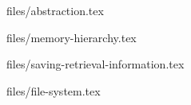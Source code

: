 \documentclass[12px]{article}
\begin{document}
    \nocite{*}
    
    
    \begin{titlepage}
        \vspace{1 cm}
        \contribute
    \end{titlepage}

    \newpage
    \tableofcontents

    \newpage
    \subject{انتزاع}{files/abstraction.tex}
    \subject{سلسه مراتب حافظه}{files/memory-hierarchy.tex}
    \subject{ذخیره‌سازی و بازیابی فایل}{files/saving-retrieval-information.tex}
    \newpage
    \subject{فایل سیسیتم}{files/file-system.tex}
\end{document}
